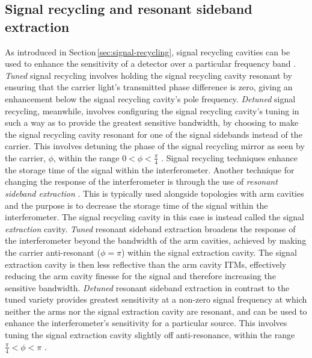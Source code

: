 \subsection{Signal recycling and resonant sideband extraction}
As introduced in Section\,\ref{sec:signal-recycling}, signal recycling cavities can be used to enhance the sensitivity of a detector over a particular frequency band \cite{Hild2006}. \emph{Tuned} signal recycling involves holding the signal recycling cavity resonant by ensuring that the carrier light's transmitted phase difference is zero, giving an enhancement below the signal recycling cavity's pole frequency. \emph{Detuned} signal recycling, meanwhile, involves configuring the signal recycling cavity's tuning in such a way as to provide the greatest sensitive bandwidth, by choosing to make the signal recycling cavity resonant for one of the signal sidebands instead of the carrier. This involves detuning the phase of the signal recycling mirror as seen by the carrier, $\phi$, within the range $0 < \phi < \frac{\pi}{4}$ \cite{Somiya2005}. Signal recycling techniques enhance the storage time of the signal within the interferometer. Another technique for changing the response of the interferometer is through the use of \emph{resonant sideband extraction} \cite{Mason2003}. This is typically used alongside topologies with arm cavities and the purpose is to decrease the storage time of the signal within the interferometer. The signal recycling cavity in this case is instead called the signal \emph{extraction} cavity. \emph{Tuned} resonant sideband extraction broadens the response of the interferometer beyond the bandwidth of the arm cavities, achieved by making the carrier anti-resonant ($\phi = \pi$) within the signal extraction cavity. The signal extraction cavity is then less reflective than the arm cavity \glspl{ITM}, effectively reducing the arm cavity finesse for the signal and therefore increasing the sensitive bandwidth. \emph{Detuned} resonant sideband extraction in contrast to the tuned variety provides greatest sensitivity at a non-zero signal frequency at which neither the arms nor the signal extraction cavity are resonant, and can be used to enhance the interferometer's sensitivity for a particular source. This involves tuning the signal extraction cavity slightly off anti-resonance, within the range $\frac{\pi}{4} < \phi < \pi$ \cite{Somiya2005}.

